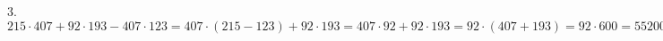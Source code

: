 3.$215\cdot407+92\cdot193-407\cdot123=407\cdot(215-123)+92\cdot193=407\cdot92+92\cdot193=92\cdot(407+193)=92\cdot600=55200.$\\
